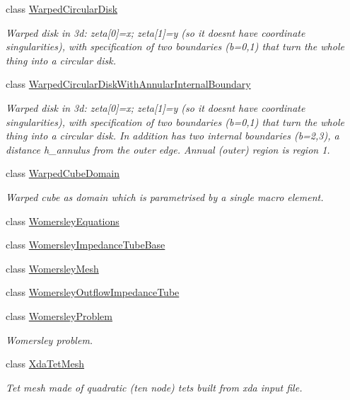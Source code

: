 \begin{DoxyCompactItemize}
\item 
class \hyperlink{classoomph_1_1WarpedCircularDisk}{Warped\+Circular\+Disk}
\begin{DoxyCompactList}\small\item\em Warped disk in 3d\+: zeta\mbox{[}0\mbox{]}=x; zeta\mbox{[}1\mbox{]}=y (so it doesn\textquotesingle{}t have coordinate singularities), with specification of two boundaries (b=0,1) that turn the whole thing into a circular disk. \end{DoxyCompactList}\item 
class \hyperlink{classoomph_1_1WarpedCircularDiskWithAnnularInternalBoundary}{Warped\+Circular\+Disk\+With\+Annular\+Internal\+Boundary}
\begin{DoxyCompactList}\small\item\em Warped disk in 3d\+: zeta\mbox{[}0\mbox{]}=x; zeta\mbox{[}1\mbox{]}=y (so it doesn\textquotesingle{}t have coordinate singularities), with specification of two boundaries (b=0,1) that turn the whole thing into a circular disk. In addition has two internal boundaries (b=2,3), a distance h\+\_\+annulus from the outer edge. Annual (outer) region is region 1. \end{DoxyCompactList}\item 
class \hyperlink{classoomph_1_1WarpedCubeDomain}{Warped\+Cube\+Domain}
\begin{DoxyCompactList}\small\item\em Warped cube as domain which is parametrised by a single macro element. \end{DoxyCompactList}\item 
class \hyperlink{classoomph_1_1WomersleyEquations}{Womersley\+Equations}
\item 
class \hyperlink{classoomph_1_1WomersleyImpedanceTubeBase}{Womersley\+Impedance\+Tube\+Base}
\item 
class \hyperlink{classoomph_1_1WomersleyMesh}{Womersley\+Mesh}
\item 
class \hyperlink{classoomph_1_1WomersleyOutflowImpedanceTube}{Womersley\+Outflow\+Impedance\+Tube}
\item 
class \hyperlink{classoomph_1_1WomersleyProblem}{Womersley\+Problem}
\begin{DoxyCompactList}\small\item\em Womersley problem. \end{DoxyCompactList}\item 
class \hyperlink{classoomph_1_1XdaTetMesh}{Xda\+Tet\+Mesh}
\begin{DoxyCompactList}\small\item\em Tet mesh made of quadratic (ten node) tets built from xda input file. \end{DoxyCompactList}\item 

\end{DoxyCompactItemize}
